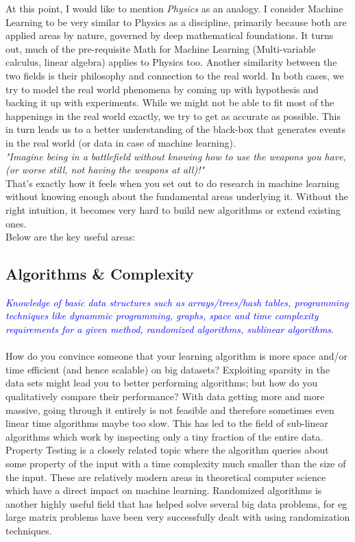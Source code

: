 \documentclass[a4paper]{article}
\begin{document}
\noindent At this point, I would like to mention {\it Physics} as an analogy. I consider Machine Learning to be very similar to Physics as a discipline, primarily because both are applied areas by nature, governed by deep mathematical foundations. It turns out, much of the pre-requisite Math for Machine Learning (Multi-variable calculus, linear algebra) applies to Physics too. Another similarity between the two fields is their philosophy and connection to the real world. In both cases, we try to model the real world phenomena by coming up with hypothesis and backing it up with experiments. While we might not be able to fit most of the happenings in the real world exactly, we try to get as accurate as possible. This in turn leads us to a better understanding of the black-box that generates events in the real world (or data in case of machine learning). \\

\noindent \textit{"Imagine being in a battlefield without knowing how to use the weapons you have, (or worse still, not having the weapons at all)!"} \\

\noindent That's exactly how it feels when you set out to do research in machine learning without knowing enough about the fundamental areas underlying it. Without the right intuition, it becomes very hard to build new algorithms or extend existing ones.\\

\noindent Below are the key useful areas:

\subsection{Algorithms \& Complexity}
\textcolor{blue}{\textit{Knowledge of basic data structures such as arrays/trees/hash tables, programming techniques like dynammic programming, graphs, space and time complexity requirements for a given method, randomized algorithms, sublinear algorithms}}.\\ \\
How do you convince someone that your learning algorithm is more space and/or time efficient (and hence scalable) on big datasets? Exploiting sparsity in the data sets might lead you to better performing algorithms; but how do you qualitatively compare their performance? With data getting more and more massive, going through it entirely is not feasible and therefore sometimes even linear time algorithms maybe too slow. This has led to the field of sub-linear algorithms which work by inspecting only a tiny fraction of the entire data. Property Testing is a closely related topic where the algorithm queries about some property of the input with a time complexity much smaller than the size of the input. These are relatively modern areas in theoretical computer science which have a direct impact on machine learning. Randomized algorithms is another highly useful field that has helped solve several big data problems, for eg large matrix problems have been very successfully dealt with using randomization techniques.\\
\end{document}
